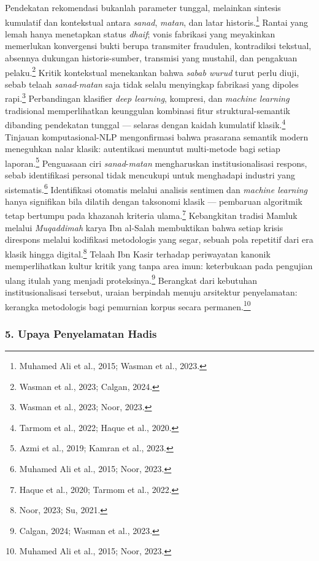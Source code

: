 Pendekatan rekomendasi bukanlah parameter tunggal, melainkan sintesis kumulatif dan kontekstual antara \textit{sanad}, \textit{matan}, dan latar historis.\footnote{Muhamed Ali et al., 2015; Wasman et al., 2023.} Rantai yang lemah hanya menetapkan status \textit{dhaif}; vonis fabrikasi yang meyakinkan memerlukan konvergensi bukti berupa transmiter fraudulen, kontradiksi tekstual, absennya dukungan historis-sumber, transmisi yang mustahil, dan pengakuan pelaku.\footnote{Wasman et al., 2023; Calgan, 2024.} Kritik kontekstual menekankan bahwa \textit{sabab wurud} turut perlu diuji, sebab telaah \textit{sanad}-\textit{matan} saja tidak selalu menyingkap fabrikasi yang dipoles rapi.\footnote{Wasman et al., 2023; Noor, 2023.} Perbandingan klasifier \textit{deep learning}, kompresi, dan \textit{machine learning} tradisional memperlihatkan keunggulan kombinasi fitur struktural-semantik dibanding pendekatan tunggal --- selaras dengan kaidah kumulatif klasik.\footnote{Tarmom et al., 2022; Haque et al., 2020.} Tinjauan komputasional-NLP mengonfirmasi bahwa prasarana semantik modern meneguhkan nalar klasik: autentikasi menuntut multi-metode bagi setiap laporan.\footnote{Azmi et al., 2019; Kamran et al., 2023.} Penguasaan ciri \textit{sanad}-\textit{matan} mengharuskan institusionalisasi respons, sebab identifikasi personal tidak mencukupi untuk menghadapi industri yang sistematis.\footnote{Muhamed Ali et al., 2015; Noor, 2023.} Identifikasi otomatis melalui analisis sentimen dan \textit{machine learning} hanya signifikan bila dilatih dengan taksonomi klasik --- pembaruan algoritmik tetap bertumpu pada khazanah kriteria ulama.\footnote{Haque et al., 2020; Tarmom et al., 2022.} Kebangkitan tradisi Mamluk melalui \textit{Muqaddimah} karya Ibn al-Salah membuktikan bahwa setiap krisis direspons melalui kodifikasi metodologis yang segar, sebuah pola repetitif dari era klasik hingga digital.\footnote{Noor, 2023; Su, 2021.} Telaah Ibn Kasir terhadap periwayatan kanonik memperlihatkan kultur kritik yang tanpa area imun: keterbukaan pada pengujian ulang itulah yang menjadi proteksinya.\footnote{Calgan, 2024; Wasman et al., 2023.} Berangkat dari kebutuhan institusionalisasi tersebut, uraian berpindah menuju arsitektur penyelamatan: kerangka metodologis bagi pemurnian korpus secara permanen.\footnote{Muhamed Ali et al., 2015; Noor, 2023.}

\subsubsection*{5. Upaya Penyelamatan Hadis}

